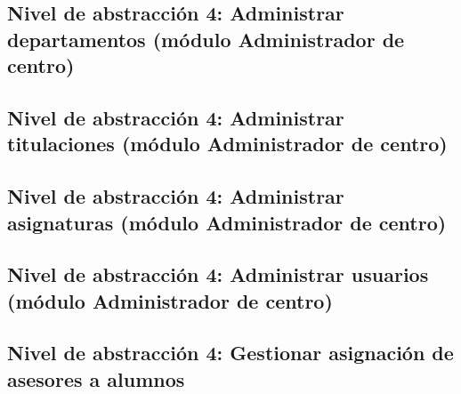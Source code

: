 \subsection{Nivel de abstracción 4: Administrar departamentos (módulo Administrador de centro)}



\subsection{Nivel de abstracción 4: Administrar titulaciones (\-mó\-dulo Administrador de centro)}



\subsection{Nivel de abstracción 4: Administrar asignaturas (\-mó\-dulo Administrador de centro)}



\subsection{Nivel de abstracción 4: Administrar usuarios (\-mó\-dulo Administrador de centro)}



\subsection{Nivel de abstracción 4: Gestionar asignación de asesores a alumnos}

